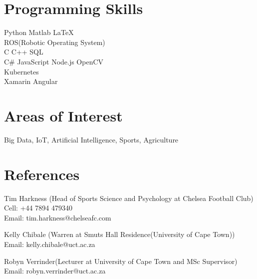 \documentclass[]{deedy-resume-openfont}
\begin{document}
%
%
\begin{minipage}[t]{0.33\textwidth} 


\section{Programming Skills}
Python \textbullet{} Matlab \textbullet{} \LaTeX\ \\
\textbullet{} ROS(Robotic Operating System)  \\
\textbullet{} C \textbullet{} C++ \textbullet{} SQL \\
C$\#$ \textbullet{} JavaScript \textbullet{} Node.js \textbullet{} OpenCV \\
\textbullet{} Kubernetes \\
Xamarin \textbullet{} Angular \\
\sectionsep

\section{Areas of Interest}
Big Data, IoT, Artificial Intelligence, Sports, Agriculture
 
 

\section{References}

Tim Harkness (Head of Sports Science and Psychology at Chelsea Football Club)\\
Cell: +44 7894 479340 \\
Email: tim.harkness@chelseafc.com \\
\sectionsep

Kelly Chibale (Warren at Smuts Hall Residence(University of Cape Town))\\
Email: kelly.chibale@uct.ac.za \\
\sectionsep

Robyn Verrinder(Lecturer at University of Cape Town and MSc Supervisor) \\
Email: robyn.verrinder@uct.ac.za \\
\sectionsep



\end{minipage} 
\end{document}
